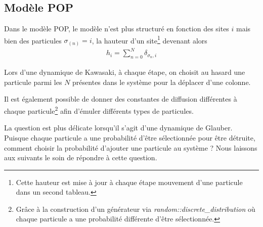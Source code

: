 	\subsection{Modèle POP}		

Dans le modèle POP, le modèle n'est plus structuré en fonction des sites $i$ mais bien des particules $\sigma_(n) = i$, la hauteur d'un site\footnote{Cette hauteur est mise à jour à chaque étape mouvement d'une particule dans un second tableau.} devenant alors
\begin{align}
	h_i = \sum_{n=0}^N \delta_{\sigma_n,i}
\end{align}

Lors d'une dynamique de Kawasaki, à chaque étape, on choisit au hasard une particule parmi les $N$ présentes dans le système pour la déplacer d'une colonne. 

Il est également possible de donner des constantes de diffusion différentes à chaque particule\footnote{Grâce à la construction d'un générateur via \textit{random::discrete\_distribution} où chaque particule a une probabilité différente d'être sélectionnée. }  afin d'émuler différents types de particules. 

La question est plus délicate lorsqu'il s'agit d'une dynamique de Glauber. Puisque chaque particule a une probabilité d'être sélectionnée pour être détruite, comment choisir la probabilité d'ajouter une particule au système ? Nous laissons aux suivants le soin de répondre à cette question. 
